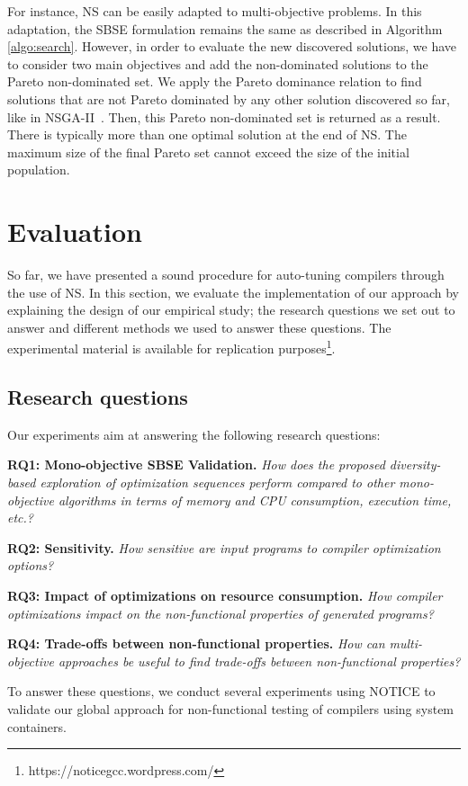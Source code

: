For instance, NS can be easily adapted to multi-objective problems. In this adaptation, the SBSE formulation remains the same as described in Algorithm \ref{algo:search}. However, in order to evaluate the new discovered solutions, we have to consider two main objectives and add the non-dominated solutions to the Pareto non-dominated set. We apply the Pareto dominance relation to find solutions that are not Pareto dominated by any other solution discovered so far, like in NSGA-II~\cite{lokuciejewski2010multi, deb2002fast}. Then, this Pareto non-dominated set is returned as a result.
There is typically more than one optimal solution at the end of NS. The maximum size of the final Pareto set cannot exceed the size of the initial population.


\section{Evaluation}
\label{sec:comp-eval}
So far, we have presented a sound procedure for auto-tuning compilers through the use of NS. In this section, we evaluate the implementation of our approach by explaining the design of our empirical study; the research questions we set out to answer and different methods we used to answer these questions. The experimental material is available for replication purposes\footnote{https://noticegcc.wordpress.com/}.

\subsection{Research questions}
Our experiments aim at answering the following research questions:

\textbf{RQ1: Mono-objective SBSE Validation.} 
\textit{How does the proposed diversity-based exploration of optimization sequences perform compared to other mono-objective algorithms in terms of memory and CPU consumption, execution time, etc.?} 


\textbf{RQ2: Sensitivity.} 
\textit{How sensitive are input programs to compiler optimization options?}


\textbf{RQ3: Impact of optimizations on resource consumption.} 
\textit{How compiler optimizations impact on the non-functional properties of generated programs?}


\textbf{RQ4: Trade-offs between non-functional properties.} 
\textit{How can multi-objective approaches be useful to find trade-offs between non-functional properties?}

To answer these questions, we conduct several experiments using NOTICE to validate our global approach for non-functional testing of compilers using system containers.


